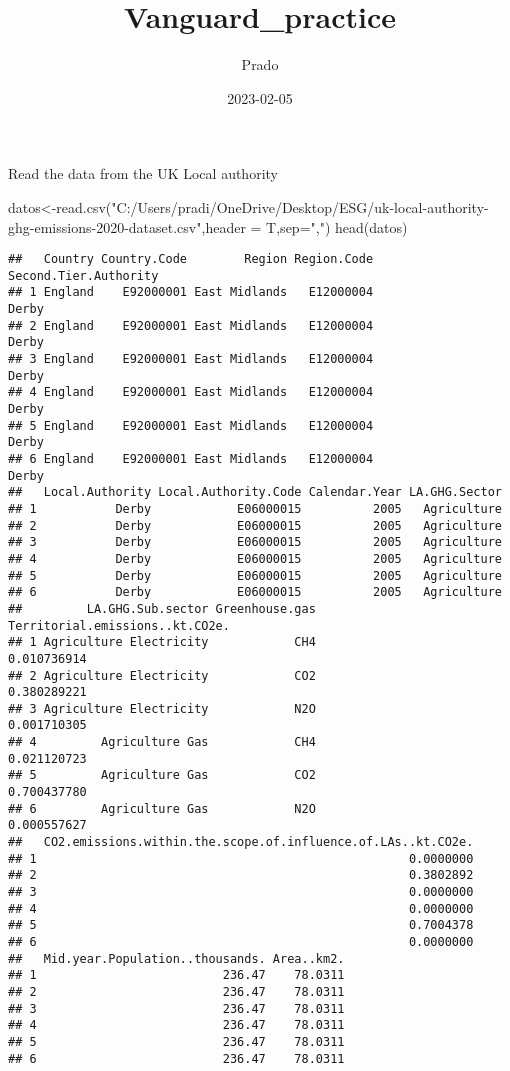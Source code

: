 \documentclass[
]{article}
\title{Vanguard\_practice}
\author{Prado}
\date{2023-02-05}
\newenvironment{Shaded}{\begin{snugshade}}{\end{snugshade}}
\newcommand{\AttributeTok}[1]{\textcolor[rgb]{0.77,0.63,0.00}{#1}}
\newcommand{\FunctionTok}[1]{\textcolor[rgb]{0.00,0.00,0.00}{#1}}
\newcommand{\NormalTok}[1]{#1}
\newcommand{\OtherTok}[1]{\textcolor[rgb]{0.56,0.35,0.01}{#1}}
\newcommand{\StringTok}[1]{\textcolor[rgb]{0.31,0.60,0.02}{#1}}
\begin{document}
\maketitle

Read the data from the UK Local authority

\begin{Shaded}
\begin{Highlighting}[]
\NormalTok{datos}\OtherTok{\textless{}{-}}\FunctionTok{read.csv}\NormalTok{(}\StringTok{"C:/Users/pradi/OneDrive/Desktop/ESG/uk{-}local{-}authority{-}ghg{-}emissions{-}2020{-}dataset.csv"}\NormalTok{,}\AttributeTok{header =}\NormalTok{ T,}\AttributeTok{sep=}\StringTok{","}\NormalTok{)}
\FunctionTok{head}\NormalTok{(datos)}
\end{Highlighting}
\end{Shaded}

\begin{verbatim}
##   Country Country.Code        Region Region.Code Second.Tier.Authority
## 1 England    E92000001 East Midlands   E12000004                 Derby
## 2 England    E92000001 East Midlands   E12000004                 Derby
## 3 England    E92000001 East Midlands   E12000004                 Derby
## 4 England    E92000001 East Midlands   E12000004                 Derby
## 5 England    E92000001 East Midlands   E12000004                 Derby
## 6 England    E92000001 East Midlands   E12000004                 Derby
##   Local.Authority Local.Authority.Code Calendar.Year LA.GHG.Sector
## 1           Derby            E06000015          2005   Agriculture
## 2           Derby            E06000015          2005   Agriculture
## 3           Derby            E06000015          2005   Agriculture
## 4           Derby            E06000015          2005   Agriculture
## 5           Derby            E06000015          2005   Agriculture
## 6           Derby            E06000015          2005   Agriculture
##         LA.GHG.Sub.sector Greenhouse.gas Territorial.emissions..kt.CO2e.
## 1 Agriculture Electricity            CH4                     0.010736914
## 2 Agriculture Electricity            CO2                     0.380289221
## 3 Agriculture Electricity            N2O                     0.001710305
## 4         Agriculture Gas            CH4                     0.021120723
## 5         Agriculture Gas            CO2                     0.700437780
## 6         Agriculture Gas            N2O                     0.000557627
##   CO2.emissions.within.the.scope.of.influence.of.LAs..kt.CO2e.
## 1                                                    0.0000000
## 2                                                    0.3802892
## 3                                                    0.0000000
## 4                                                    0.0000000
## 5                                                    0.7004378
## 6                                                    0.0000000
##   Mid.year.Population..thousands. Area..km2.
## 1                          236.47    78.0311
## 2                          236.47    78.0311
## 3                          236.47    78.0311
## 4                          236.47    78.0311
## 5                          236.47    78.0311
## 6                          236.47    78.0311
\end{verbatim}
\end{document}
